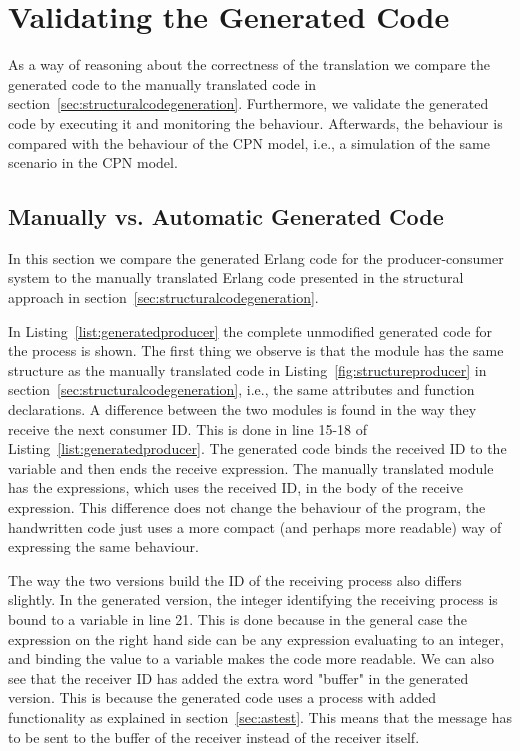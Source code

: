 \section{Validating the Generated Code}
\label{sec:validateprodcons}
As a way of reasoning about the correctness of the translation we compare the generated code to the manually translated code in section~\ref{sec:structuralcodegeneration}. Furthermore, we validate the generated code by executing it and monitoring the behaviour. Afterwards, the behaviour is compared with the behaviour of the CPN model, i.e., a simulation of the same scenario in the CPN model.

\subsection{Manually vs. Automatic Generated Code}
In this section we compare the generated Erlang code for the producer-consumer system to the manually translated Erlang code presented in the structural approach in section~\ref{sec:structuralcodegeneration}. 



In Listing~\ref{list:generatedproducer} the complete unmodified generated code for the  process is shown. The first thing we observe is that the module has the same structure as the manually translated code in Listing~\ref{fig:structureproducer} in section~\ref{sec:structuralcodegeneration}, i.e., the same attributes and function declarations. A difference between the two modules is found in the way they receive the next consumer ID. This is done in line 15-18 of Listing~\ref{list:generatedproducer}. The generated code binds the received ID to the variable  and then ends the receive expression. The manually translated module has the expressions, which uses the received ID, in the body of the receive expression. This difference does not change the behaviour of the program, the handwritten code just uses a more compact (and perhaps more readable) way of expressing the same behaviour.

The way the two versions build the ID of the receiving process also differs slightly. In the generated version, the integer identifying the receiving process is bound to a variable in line 21. This is done because in the general case the expression on the right hand side can be any expression evaluating to an integer, and binding the value to a variable makes the code more readable. We can also see that the receiver ID has added the extra word "buffer" in the generated version. This is because the generated code uses a  process with added functionality as explained in section~\ref{sec:astest}. This means that the message has to be sent to the buffer of the receiver instead of the receiver itself.

